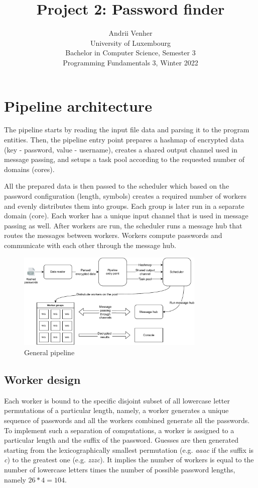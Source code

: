 \documentclass{article}
\title{Project 2: Password finder}
\author{Andrii Venher\\
  \small University of Luxembourg\\
  \small Bachelor in Computer Science, Semester 3\\
  \small Programming Fundamentals 3, Winter 2022
}
\date{}
\begin{document}
\maketitle

\section{Pipeline architecture}

The pipeline starts by reading the input file data and parsing it to the program entities. Then, the pipeline entry point prepares a hashmap of encrypted data (key - password, value - username), creates a shared output channel used in message passing, and setups a task pool according to the requested number of domains (cores).
 
All the prepared data is then passed to the scheduler which based on the password configuration (length, symbols) creates a required number of workers and evenly distributes them into groups. Each group is later run in a separate domain (core). Each worker has a unique input channel that is used in message passing as well. After workers are run, the scheduler runs a message hub that routes the messages between workers. Workers compute passwords and communicate with each other through the message hub. 

\begin{figure}[h]
  \caption{General pipeline}
  \vspace{0.2in}
  \centering
  \includegraphics[width=0.8\textwidth]{resources/general_pipeline.pdf}
\end{figure}

\subsection{Worker design}

Each worker is bound to the specific disjoint subset of all lowercase letter permutations of a particular length, namely, a worker generates a unique sequence of passwords and all the workers combined generate all the passwords. To implement such a separation of computations, a worker is assigned to a particular length and the suffix of the password. Guesses are then generated starting from the lexicographically smallest permutation (e.g. \emph{aaac} if the suffix is \emph{c}) to the greatest one (e.g. \emph{zzzc}). It implies the number of workers is equal to the number of lowercase letters times the number of possible password lengths, namely $ 26 * 4 = 104 $.
\end{document}
